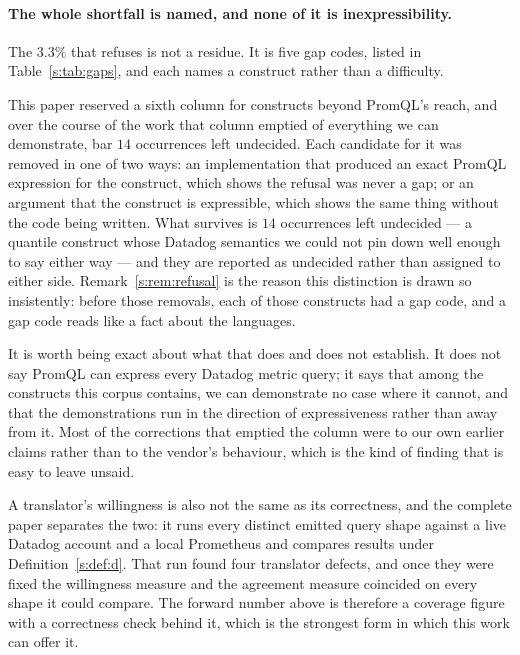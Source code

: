 \paragraph{The whole shortfall is named, and none of it is inexpressibility.}
The $3.3\%$ that refuses is not a residue. It is five gap codes, listed in
Table~\ref{s:tab:gaps}, and each names a construct rather than a difficulty.

\begin{table}[htbp]\centering\scriptsize

\caption{The complete gap catalogue for the forward direction. Five codes account for
every refusal. Shares are of the $8{,}770$ occurrences.}
\label{s:tab:gaps}
\end{table}

\noindent
This paper reserved a sixth column for constructs beyond PromQL's reach, and over the
course of the work that column emptied of everything we can demonstrate, bar $14$
occurrences left undecided. Each candidate for it was removed in one of two
ways: an implementation that produced an exact PromQL expression for the construct, which
shows the refusal was never a gap; or an argument that the construct is expressible,
which shows the same thing without the code being written. What survives is $14$
occurrences left undecided --- a quantile construct whose Datadog semantics we could not
pin down well enough to say either way --- and they are reported as undecided rather than
assigned to either side. Remark~\ref{s:rem:refusal} is the reason this distinction is
drawn so insistently: before those removals, each of those constructs had a gap code, and
a gap code reads like a fact about the languages.

It is worth being exact about what that does and does not establish. It does not say
PromQL can express every Datadog metric query; it says that among the constructs this
corpus contains, we can demonstrate no case where it cannot, and that the demonstrations
run in the direction of expressiveness rather than away from it. Most of the corrections
that emptied the column were to our own earlier claims rather than to the vendor's
behaviour, which is the kind of finding that is easy to leave unsaid.

A translator's willingness is also not the same as its correctness, and the complete
paper separates the two: it runs every distinct emitted query shape against a live
Datadog account and a local Prometheus and compares results under
Definition~\ref{s:def:d}. That run found four translator defects, and once they were
fixed the willingness measure and the agreement measure coincided on every shape it could
compare. The forward number above is therefore a coverage figure with a correctness check
behind it, which is the strongest form in which this work can offer it.
